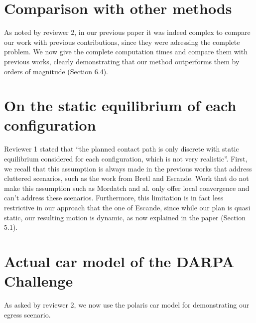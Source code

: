 \documentclass[12pt]{article}
\begin{document}
\section{Comparison with other methods}
As noted by reviewer 2, in our previous paper it was indeed complex to compare our work with previous contributions,
since they were adressing the complete problem. We now give the complete computation times and compare them with previous works,
clearly demonstrating that our method outperforms them by orders of magnitude (Section 6.4).


\section{On the static equilibrium of each configuration}
Reviewer 1 stated that ``the planned contact path is only discrete with static equilibrium considered for each
configuration, which is not very realistic''. First, we recall that this assumption is always made in the previous works that address cluttered scenarios,
such as the work from Bretl and Escande. Work that do not make this assumption such as Mordatch and al. only offer local convergence and can't address these scenarios. Furthermore, this limitation is in fact less restrictive in our approach that the one of Escande, since while our plan is quasi static, our resulting motion is dynamic, as now explained in the paper (Section 5.1). 

\section{Actual car model of the DARPA Challenge}
As asked by reviewer 2, we now use the polaris car model for demonstrating our egress scenario.
\end{document}
